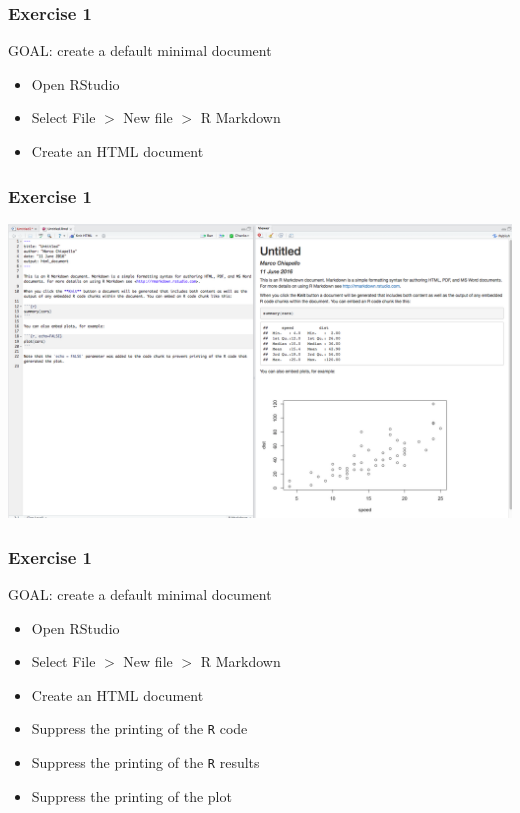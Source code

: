\documentclass{beamer}
\begin{document}
\begin{frame}
    \frametitle{Exercise 1}
    {\sc GOAL: create a default minimal document}
    \begin{itemize}
        \item Open RStudio
            \pause
        \item Select File $>$ New file $>$ R Markdown
            \pause
        \item Create an HTML document
    \end{itemize}
\end{frame}
\begin{frame}
    \frametitle{Exercise 1}
    \begin{center}\includegraphics[scale=0.23]{figures/RmarkdownExample.png}\end{center}
\end{frame}
\begin{frame}
    \frametitle{Exercise 1}
    {\sc GOAL: create a default minimal document}
    \begin{itemize}
        \item Open RStudio
        \item Select File $>$ New file $>$ R Markdown
        \item Create an HTML document
	\item Suppress the printing of the \texttt{R} code
		\pause
	\item Suppress the printing of the \texttt{R} results
		\pause
	\item Suppress the printing of the plot
    \end{itemize}
\end{frame}
\end{document}
